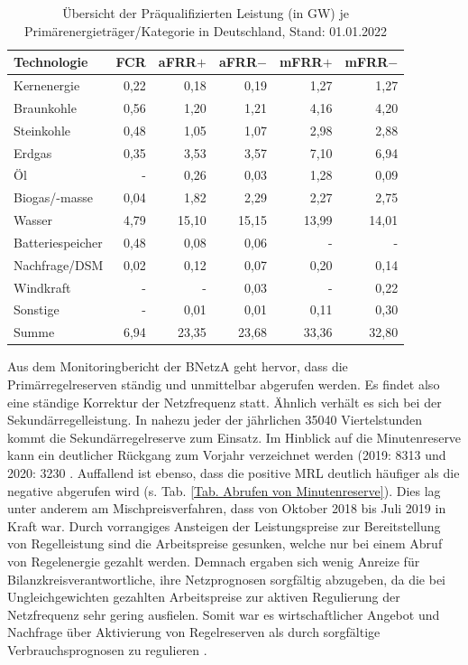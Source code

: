 			\begin{table}[H]
				\renewcommand*{\arraystretch}{1.3} %
				\centering
				\caption{Übersicht der Präqualifizierten Leistung (in \si{\giga\watt}) je Primärenergieträger/Kategorie in Deutschland, Stand: 01.01.2022 \cite{regelleistungnet_PRL_Ausschreibung}}
				\label{Tab. Übersicht der Präqualifizierten Leistung je PrimärenergieträgerKategorie in Deutschland}
				\begin{tabular}{lrrrrr}
					\hline
					Technologie & FCR  & aFRR$+$ & aFRR$-$& mFRR$+$ & mFRR$-$ \\ \hline
					Kernenergie & 0,22 & 0,18 & 0,19 & 1,27 & 1,27 \\
					Braunkohle & 0,56 & 1,20 & 1,21 & 4,16 & 4,20 \\
					Steinkohle & 0,48 & 1,05 & 1,07 & 2,98 & 2,88 \\
					Erdgas & 0,35 & 3,53 & 3,57 & 7,10 & 6,94 \\
					Öl & - & 0,26 & 0,03 & 1,28 & 0,09 \\
					Biogas/-masse & 0,04 & 1,82 & 2,29 & 2,27 & 2,75 \\
					Wasser & 4,79 & 15,10 & 15,15 & 13,99 & 14,01 \\
					Batteriespeicher & 0,48 & 0,08 & 0,06 & - & - \\
					Nachfrage/DSM & 0,02 & 0,12 & 0,07 & 0,20 & 0,14 \\
					Windkraft & - & - & 0,03 & - & 0,22 \\
					Sonstige & - & 0,01 & 0,01 & 0,11 & 0,30 \\ \hline
					Summe & 6,94 & 23,35 & 23,68 & 33,36 & 32,80
				\end{tabular}
				\renewcommand*{\arraystretch}{1.3} %
			\end{table}
			\renewcommand*{\arraystretch}{1.3} %
			
			Aus dem Monitoringbericht der BNetzA geht hervor, dass die Primärregelreserven ständig und unmittelbar abgerufen werden. 
			Es findet also eine ständige Korrektur der Netzfrequenz statt.
			Ähnlich verhält es sich bei der Sekundärregelleistung. 
			In nahezu jeder der jährlichen \num{35040} Viertelstunden kommt die Sekundärregelreserve zum Einsatz.
			Im Hinblick auf die Minutenreserve kann ein deutlicher Rückgang zum Vorjahr verzeichnet werden (2019: 8313 und 2020: 3230 \cite{Monitoringbericht_BNetzA}.
			Auffallend ist ebenso, dass die positive MRL deutlich häufiger als die negative abgerufen wird (s. Tab. \ref{Tab. Abrufen von Minutenreserve}).
			Dies lag unter anderem am Mischpreisverfahren, dass von Oktober 2018 bis Juli 2019 in Kraft war.
			Durch vorrangiges Ansteigen der Leistungspreise zur Bereitstellung von Regelleistung sind die Arbeitspreise gesunken, welche nur bei einem Abruf von Regelenergie gezahlt werden.
			Demnach ergaben sich wenig Anreize für Bilanzkreisverantwortliche, ihre Netzprognosen sorgfältig abzugeben, da die bei Ungleichgewichten gezahlten Arbeitspreise zur aktiven Regulierung der Netzfrequenz sehr gering ausfielen.
			Somit war es wirtschaftlicher Angebot und Nachfrage über Aktivierung von Regelreserven als durch sorgfältige Verbrauchsprognosen zu regulieren \cite{Monitoringbericht_BNetzA}.
						
